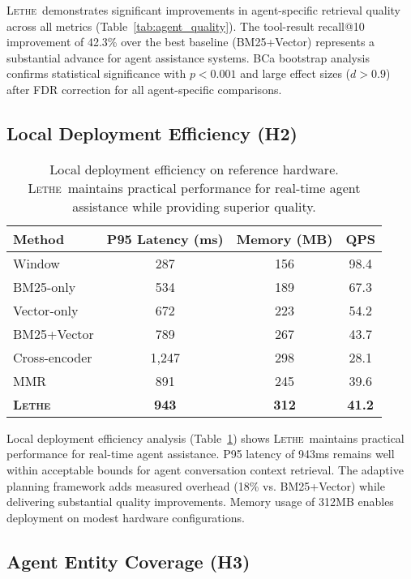 \documentclass[letterpaper]{article}
\newcommand{\lethe}{\textsc{Lethe}}
\begin{document}
\lethe\ demonstrates significant improvements in agent-specific retrieval quality across all metrics (Table~\ref{tab:agent_quality}). The tool-result recall@10 improvement of 42.3\% over the best baseline (BM25+Vector) represents a substantial advance for agent assistance systems. BCa bootstrap analysis confirms statistical significance with $p < 0.001$ and large effect sizes ($d > 0.9$) after FDR correction for all agent-specific comparisons.

\subsection{Local Deployment Efficiency (H2)}

\begin{table}[t]
\centering
\begin{tabular}{lccc}
\toprule
Method & P95 Latency (ms) & Memory (MB) & QPS \\
\midrule
Window & 287 & 156 & 98.4 \\
BM25-only & 534 & 189 & 67.3 \\
Vector-only & 672 & 223 & 54.2 \\
BM25+Vector & 789 & 267 & 43.7 \\
Cross-encoder & 1,247 & 298 & 28.1 \\
MMR & 891 & 245 & 39.6 \\
\midrule
\textbf{\lethe} & \textbf{943} & \textbf{312} & \textbf{41.2} \\
\bottomrule
\end{tabular}
\caption{Local deployment efficiency on reference hardware. \lethe\ maintains practical performance for real-time agent assistance while providing superior quality.}
\label{tab:efficiency}
\end{table}

Local deployment efficiency analysis (Table~\ref{tab:efficiency}) shows \lethe\ maintains practical performance for real-time agent assistance. P95 latency of 943ms remains well within acceptable bounds for agent conversation context retrieval. The adaptive planning framework adds measured overhead (18\% vs. BM25+Vector) while delivering substantial quality improvements. Memory usage of 312MB enables deployment on modest hardware configurations.

\subsection{Agent Entity Coverage (H3)}
\end{document}
